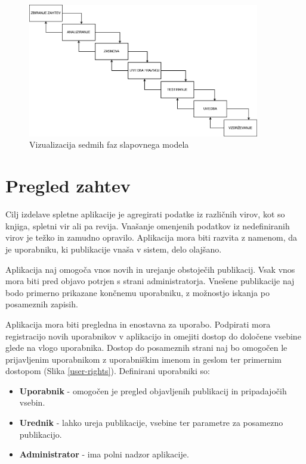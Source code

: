\documentclass[a4paper, 12pt]{book}
\begin{document}
\begin{figure}[h]
\begin{center}
\includegraphics[width=0.9\textwidth]{slike/waterfall.png}
\end{center}
\caption{ Vizualizacija sedmih faz slapovnega modela }
\label{waterfall-phases}
\end{figure}

\section{Pregled zahtev}
Cilj izdelave spletne aplikacije je agregirati podatke iz različnih virov, kot so knjiga, spletni vir ali pa revija. Vnašanje omenjenih podatkov iz nedefiniranih virov je težko in zamudno opravilo. Aplikacija mora biti razvita z namenom, da je uporabniku, ki publikacije vnaša v sistem, delo olajšano. 

Aplikacija naj omogoča vnos novih in urejanje obstoječih publikacij. Vsak vnos mora biti pred objavo potrjen s strani administratorja. Vnešene publikacije naj bodo primerno prikazane končnemu uporabniku, z možnostjo iskanja po posameznih zapisih. 


Aplikacija mora biti pregledna in enostavna za uporabo. Podpirati mora registracijo novih uporabnikov v aplikacijo in omejiti dostop do določene vsebine glede na vlogo uporabnika. Dostop do posameznih strani naj bo omogočen le prijavljenim uporabnikom z uporabniškim imenom in geslom ter primernim dostopom (Slika \ref{user-rights}). Definirani uporabniki so: 
\begin{itemize}
    \item \textbf{Uporabnik} - omogočen je pregled objavljenih publikacij in pripadajočih vsebin.
	\item \textbf{Urednik} - lahko ureja publikacije, vsebine ter parametre za posamezno publikacijo.
	\item \textbf{Administrator} - ima polni nadzor aplikacije.
\end{itemize}
\end{document}
